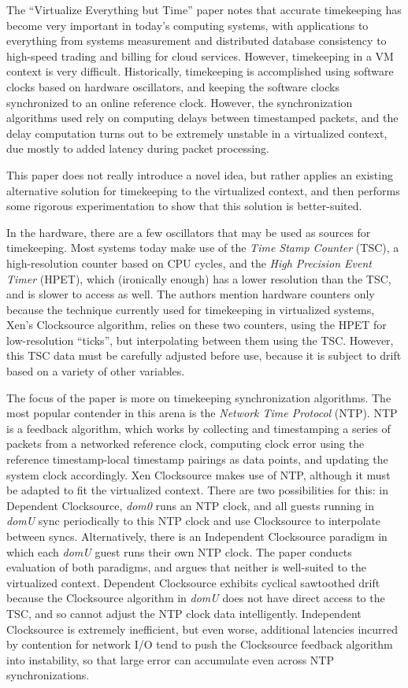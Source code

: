 \documentclass[letterpaper, twocolumn]{article}
\begin{document}
The ``Virtualize Everything but Time'' paper \cite{ref:time} notes that accurate
timekeeping has become very important in today's computing systems, with
applications to everything from systems measurement and distributed database
consistency to high-speed trading and billing for cloud services.  However, 
timekeeping in a VM context is very difficult.  Historically, timekeeping
is accomplished using software clocks based on hardware oscillators, and
keeping the software clocks synchronized to an online
reference clock.  However, the synchronization algorithms used rely on
computing delays between timestamped packets, and the delay computation
turns out to be extremely unstable in a virtualized context, due mostly
to added latency during packet processing.

This paper does not really introduce a novel idea, but rather applies
an existing alternative solution for timekeeping to the virtualized context,
and then performs some rigorous experimentation to show that this solution
is better-suited.

In the hardware, there are a few oscillators that may be used as sources
for timekeeping.  Most systems today make use of the \emph{Time Stamp Counter}
(TSC), a high-resolution counter based on CPU cycles, and the
\emph{High Precision Event Timer} (HPET), which (ironically enough) has a
lower resolution than the TSC, and is slower to access as well.  The authors
mention hardware counters only because the technique currently used for timekeeping
in virtualized systems, Xen's Clocksource algorithm, relies on these two counters,
using the HPET for low-resolution ``ticks'', but interpolating between them using
the TSC.  However, this TSC data must be carefully adjusted before use, because
it is subject to drift based on a variety of other variables.

The focus of the paper is more on timekeeping synchronization algorithms.
The most popular contender in this arena is the \emph{Network Time Protocol} (NTP).
NTP is a feedback algorithm, which works by collecting and timestamping a series
of packets from a networked reference clock, computing clock error using
the reference timestamp-local timestamp pairings as data points, 
and updating the system clock accordingly.  Xen Clocksource makes use of NTP,
although it must be adapted to fit the virtualized context.  There are two
possibilities for this:  in Dependent Clocksource, \emph{dom0} runs an NTP
clock, and all guests running in \emph{domU} sync periodically to this NTP
clock and use Clocksource to interpolate between syncs.  Alternatively, there
is an Independent Clocksource paradigm in which each \emph{domU} guest runs their own
NTP clock.  The paper conducts evaluation of both paradigms, and argues
that neither is well-suited to the virtualized context.  Dependent Clocksource
exhibits cyclical sawtoothed drift because the Clocksource algorithm in
\emph{domU} does not have direct access to the TSC, and so cannot adjust
the NTP clock data intelligently.  Independent Clocksource is extremely
inefficient, but even worse, additional latencies incurred by contention for
network I/O tend to push the Clocksource feedback algorithm into instability,
so that large error can accumulate even across NTP synchronizations.
\end{document}
